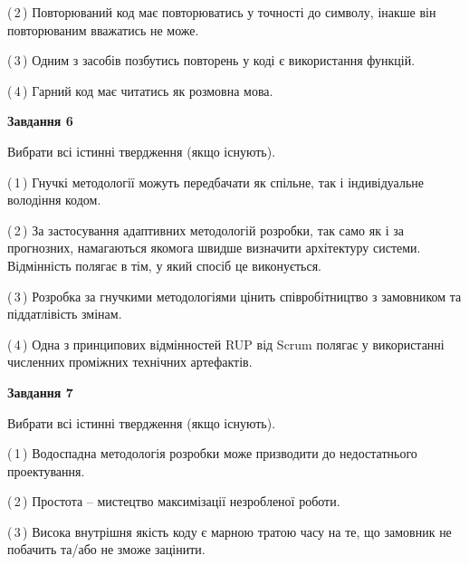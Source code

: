 \documentclass[10pt, ukrainian]{article}
\begin{document}
{\begin {large}
(\,2\,) Повторюваний код має повторюватись у точності до символу, інакше він повторюваним вважатись не може. %



(\,3\,) Одним з засобів позбутись повторень у коді є використання функцій. %



(\,4\,) Гарний код має читатись як розмовна мова. %

\newpage

{\begin {center}\textbf{Завдання 6}\end {center}}\par
Вибрати всі істинні твердження (якщо існують).\par
\vspace{2mm}



(\,1\,) Гнучкі методології можуть передбачати як спільне, так і індивідуальне володіння кодом. %



(\,2\,) За застосування адаптивних методологій розробки, так само як і за прогнозних, намагаються якомога швидше визначити архітектуру системи. Відмінність полягає в тім, у який спосіб це виконується.%



(\,3\,) Розробка за гнучкими методологіями цінить співробітництво з замовником та піддатлівість змінам. %



(\,4\,) Одна з принципових відмінностей RUP від Scrum полягає у використанні численних проміжних технічних артефактів. %


{\begin {center}\textbf{Завдання 7}\end {center}}\par
Вибрати всі істинні твердження (якщо існують).\par
\vspace{2mm}



(\,1\,) Водоспадна методологія розробки може призводити до недостатнього проектування. %



(\,2\,) Простота – мистецтво максимізації незробленої роботи. %



(\,3\,) Висока внутрішня якість коду є марною тратою часу на те, що замовник не побачить та/або не зможе зацінити. %




\end{large}}
\end{document}
